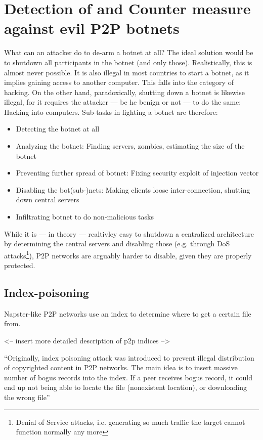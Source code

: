 \documentclass{llncs}
\begin{document}
\section{Detection of and Counter measure against evil P2P botnets}
\label{counter-measure}
What can an attacker do to de-arm a botnet at all? The ideal solution would be to shutdown all participants in the botnet (and only those). Realistically, this is almost never possible. It is also illegal in most countries to start a botnet, as it implies gaining access to another computer. This falls into the category of hacking. On the other hand, paradoxically, shutting down a botnet is likewise illegal, for it requires the attacker --- be he benign or not --- to do the same: Hacking into computers. Sub-tasks in fighting a botnet are therefore:
\begin{itemize}
\item Detecting the botnet at all
\item Analyzing the botnet: Finding servers, zombies, estimating the size of the botnet
\item Preventing further spread of botnet: Fixing security exploit of injection vector
\item Disabling the bot(sub-)nets: Making clients loose inter-connection, shutting down central servers
\item Infiltrating botnet to do non-malicious tasks
\end{itemize}

While it is --- in theory --- realtivley easy to shutdown a centralized architecture by determining the central servers and disabling those (e.g. through DoS attacks\footnote{Denial of Service attacks, i.e. generating so much traffic the target cannot function normally any more}), P2P networks are arguably harder to disable, given they are properly protected. 

\subsection{Index-poisoning}
Napster-like P2P networks use an index to determine where to get a
certain file from. 

<-- insert more detailed description of p2p indices -->

``Originally, index poisoning attack was introduced to prevent
illegal distribution of copyrighted content in P2P networks. The main
idea is to insert massive number of bogus records into the index. If a
peer receives bogus record, it could end up not being able to locate
the file (nonexistent location), or downloading the wrong
file''\cite{wang2009systematic}
\end{document}
